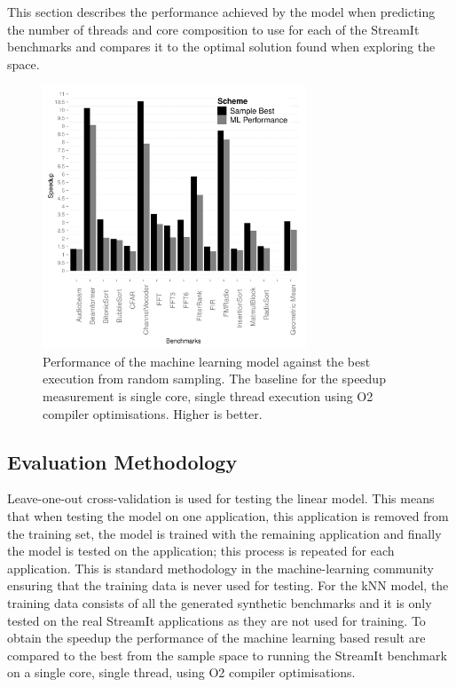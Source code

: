 This section describes the performance achieved by the model when predicting the number of threads and core composition to use for each of the StreamIt benchmarks and compares it to the optimal solution found when exploring the space.

\begin{figure}[h]
    \centering
    \includegraphics[width=0.7\textwidth]{streamit-paper/graphics/results.pdf}
    \caption{Performance of the machine learning model against the best execution from random sampling. The baseline for the speedup measurement is single core, single thread execution using O2 compiler optimisations. Higher is better.}\label{fig:results}
\end{figure}

\subsection{Evaluation Methodology}

Leave-one-out cross-validation is used for testing the linear model.
This means that when testing the model on one application, this application is removed from the training set, the model is trained with the remaining application and finally the model is tested on the application; this process is repeated for each application.
This is standard methodology in the machine-learning community ensuring that the training data is never used for testing.
For the kNN model, the training data consists of all the generated synthetic benchmarks and it is only tested on the real StreamIt applications as they are not used for training.
To obtain the speedup the performance of the machine learning based result are compared to the best from the sample space to running the StreamIt benchmark on a single core, single thread, using O2 compiler optimisations. 

